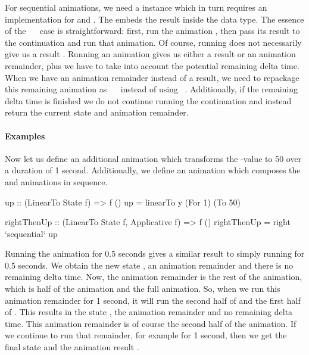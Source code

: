 For sequential animations, we need a  instance which in turn requires an implementation for  and \hs{>>=}. The  embeds the result  inside the  data type. The essence of the ~\hs{>>=}~ case is straightforward: first, run the animation , then pass its result to the continuation  and run that animation. Of course, running  does not necessarily give us a result . Running an animation gives us either a result or an animation remainder, plus we have to take into account the potential remaining delta time. When we have an animation remainder instead of a result, we need to repackage this remaining animation as ~\hs{>>=}~ instead of using ~. Additionally, if the remaining delta time is finished we do not continue running the continuation and instead return the current state and animation remainder.

\paragraph{Examples}

Now let us define an additional animation  which transforms the -value to 50 over a duration of 1 second. Additionally, we define an animation  which composes the  and  animations in sequence.

\begin{code}
up :: (LinearTo State f) => f ()
up = linearTo y (For 1) (To 50)

rightThenUp :: (LinearTo State f, Applicative f) => f ()
rightThenUp = right `sequential` up
\end{code}

Running the  animation for 0.5 seconds gives a similar result to simply running  for 0.5 seconds. We obtain the new state , an animation remainder  and there is no remaining delta time. Now, the animation remainder is the rest of the  animation, which is half of the  animation and the full  animation. So, when we run this animation remainder for 1 second, it will run the second half of  and the first half of .
This results in the state , the animation remainder  and no remaining delta time. This animation remainder is of course the second half of the  animation. If we continue to run that remainder, for example for 1 second, then we get the final state  and the animation result \hs{()}.

